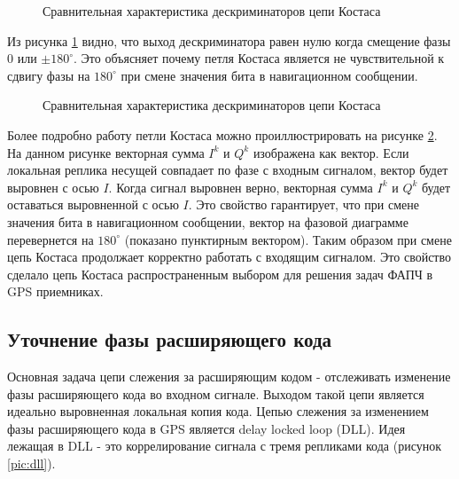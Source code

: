 \begin{figure}[h]
\begin{center}
\end{center}
\caption{Сравнительная характеристика дескриминаторов цепи Костаса}
\label{pic:descriminator}
\end{figure}

Из рисунка \ref{pic:descriminator} видно, что выход дескриминатора равен нулю когда смещение фазы 0 или ${\pm{180}^\circ}$.
Это объясняет почему петля Костаса является не чувствительной к сдвигу фазы на ${180^\circ}$ при смене значения бита
в навигационном сообщении.

\begin{figure}[h]
\begin{center}
\end{center}
\caption{Сравнительная характеристика дескриминаторов цепи Костаса}
\label{pic:phasor}
\end{figure}

Более подробно работу петли Костаса можно проиллюстрировать на рисунке \ref{pic:phasor}. На данном рисунке векторная сумма
${I^k}$ и ${Q^k}$ изображена как вектор. Если локальная реплика несущей совпадает по фазе с входным сигналом, вектор будет
выровнен с осью ${I}$. Когда сигнал выровнен верно, векторная сумма ${I^k}$ и ${Q^k}$ будет оставаться выровненной с осью ${I}$.
Это свойство гарантирует, что при смене значения бита в навигационном сообщении, вектор на фазовой диаграмме перевернется на
${180^\circ}$ (показано пунктирным вектором). Таким образом при смене цепь Костаса продолжает корректно работать с входящим сигналом.
Это свойство сделало цепь Костаса распространенным выбором для решения задач ФАПЧ в GPS приемниках.

\subsection{Уточнение фазы расширяющего кода}
Основная задача цепи слежения за расширяющим кодом - отслеживать изменение фазы расширяющего кода во входном
сигнале. Выходом такой цепи является идеально выровненная локальная копия кода. Цепью слежения за изменением
фазы расширяющего кода в GPS является delay locked loop (DLL). Идея лежащая в DLL - это коррелирование
сигнала с тремя репликами кода (рисунок \ref{pic:dll}).

